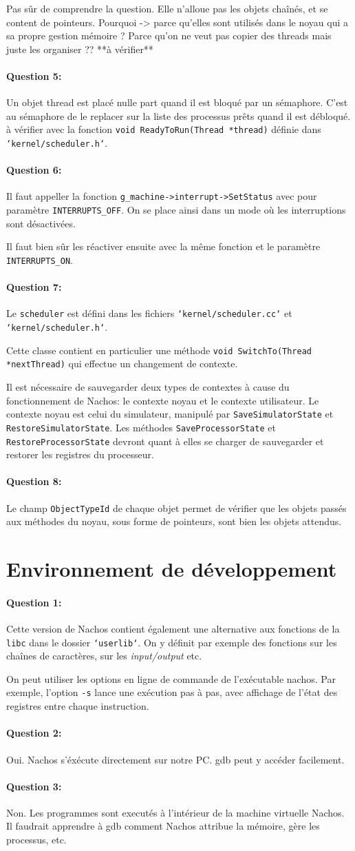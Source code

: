\documentclass[11pt]{article}
\def\question#1{\paragraph{Question #1:}}
\def\pathfile#1{\texttt{`#1`}}
\def\var#1{\texttt{#1}}
\def\func#1{\texttt{#1}}
\def\obj#1{\texttt{#1}}
\def\comment#1{\color{red}#1\color{black}}
\begin{document}
\comment{Pas sûr de comprendre la question. Elle n'alloue pas les objets chaînés, et se content de pointeurs. Pourquoi -> parce qu'elles sont utilisés dans le noyau qui a sa propre gestion mémoire ? Parce qu'on ne veut pas copier des threads mais juste les organiser ?? **à vérifier**  }

\question{5} Un objet thread est placé \comment{nulle part} quand il est bloqué par un sémaphore. C'est au sémaphore de le replacer sur la liste des processus prêts quand il est débloqué. \comment{à vérifier} avec la fonction \func{void ReadyToRun(Thread *thread)} définie dans \pathfile{kernel/scheduler.h}.

\question{6} Il faut appeller la fonction \func{g\_machine->interrupt->SetStatus} avec pour paramètre \var{INTERRUPTS\_OFF}. On se place ainsi dans un mode où les interruptions sont désactivées.  

Il faut bien sûr les réactiver ensuite avec la même fonction et le paramètre \var{INTERRUPTS\_ON}.

\question{7}  Le \obj{scheduler} est défini dans les fichiers \pathfile{kernel/scheduler.cc} et \pathfile{kernel/scheduler.h}.

Cette classe contient en particulier une méthode \func{void SwitchTo(Thread *nextThread)} qui effectue un changement de contexte.  

Il est nécessaire de sauvegarder deux types de contextes à cause du fonctionnement de Nachos: le contexte noyau et le contexte utilisateur.  
Le contexte noyau est celui du simulateur, manipulé par \func{SaveSimulatorState} et \func{RestoreSimulatorState}.  
Les méthodes \func{SaveProcessorState} et \func{RestoreProcessorState} devront quant à elles se charger de sauvegarder et restorer les registres du processeur.

\question{8}  Le champ \var{ObjectTypeId} de chaque objet permet de vérifier que les objets passés aux méthodes du noyau, sous forme de pointeurs, sont bien les objets attendus.

\section{Environnement de développement}
\question{1} 
Cette version de Nachos contient également une alternative aux fonctions de la \texttt{libc} dans le dossier \pathfile{userlib}. On y définit par exemple des fonctions sur les chaînes de caractères, sur les \textit{input/output} etc.

On peut utiliser les options en ligne de commande de l'exécutable nachos. Par exemple, l'option \texttt{-s} lance une exécution pas à pas, avec affichage de l'état des registres entre chaque instruction.


\question{2} Oui. Nachos s'éxécute directement sur notre PC. gdb peut y accéder facilement.

\question{3} Non. Les programmes sont executés à l'intérieur de la machine virtuelle Nachos. Il faudrait apprendre à gdb comment Nachos attribue la mémoire, gère les processus, etc.
\end{document}
